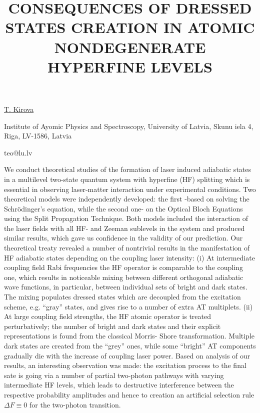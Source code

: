 \title{CONSEQUENCES OF DRESSED STATES CREATION IN ATOMIC NONDEGENERATE HYPERFINE LEVELS}

\underline{T. Kirova} 

{\normalsize{\vspace{-4mm}
Institute of Ayomic Physics and Spectroscopy, University of Latvia, Skunu iela 4, Riga, LV-1586, Latvia

\email teo@lu.lv}}

We conduct theoretical studies of the formation of laser induced adiabatic states in a multilevel
two-state quantum system with hyperfine (HF) splitting which is essential in observing laser-matter
interaction under experimental conditions. Two theoretical models were independently developed: the
first -based on solving the Schr\"{o}dinger's equation, while the second one- on the Optical Bloch
Equations using the Split Propagation Technique. Both models included the interaction of the laser
fields with all HF- and Zeeman sublevels in the system and produced similar results, which gave us
confidence in the validity of our prediction. Our theoretical treaty revealed a number of nontrivial
results in the manifestation of HF adiabatic states depending on the coupling laser intensity:
(i) At intermediate coupling field Rabi frequencies the HF operator is comparable to the coupling
one, which results in noticeable mixing between different orthogonal adiabatic wave functions, in
particular, between individual sets of bright and dark states. The mixing populates dressed states
which are decoupled from the excitation scheme, e.g. ``gray'' states, and gives rise to a number of
extra AT multiplets.
(ii) At large coupling field strengths, the HF atomic operator is treated perturbatively; the number
of bright and dark states and their explicit representations is found from the classical Morris-
Shore transformation. Multiple dark states are created from the ``grey'' ones, while some ``bright'' AT
components gradually die with the increase of coupling laser power.
Based on analysis of our results, an interesting observation was made: the excitation process to the
final sate is going via a number of partial two-photon pathways with varying intermediate HF levels,
which leads to destructive interference between the respective probability amplitudes and hence to
creation an artificial selection rule $\Delta F \equiv 0$ for the two-photon transition.


\vspace{\baselineskip}
